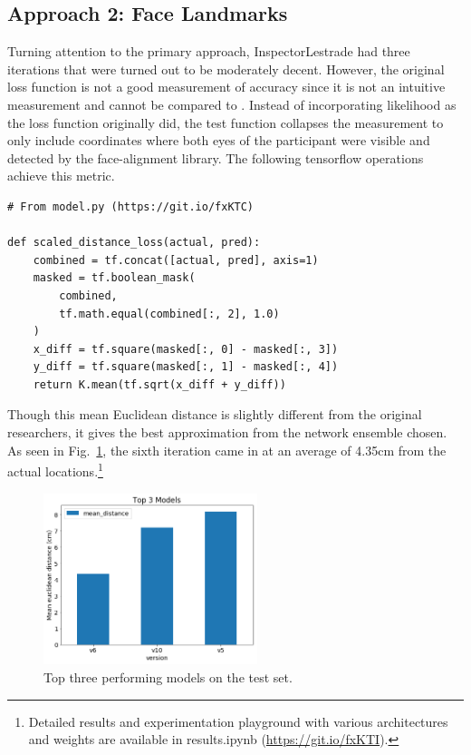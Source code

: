 \documentclass[aip, rsi, amsmath, amssymb, reprint, author-year, longbibliography]{revtex4-1}
\begin{document}
\subsection{\label{sec:level2} Approach 2: Face Landmarks}

Turning attention to the primary approach, InspectorLestrade had three
iterations that were turned out to be moderately decent. However, the original
loss function is not a good measurement of accuracy since it is not an intuitive
measurement and cannot be compared to \cite{7780608}. Instead of incorporating
likelihood as the loss function originally did, the test function collapses the
measurement to only include coordinates where both eyes of the participant were
visible and detected by the face-alignment library. The following tensorflow
operations achieve this metric.

\begin{lstlisting}
# From model.py (https://git.io/fxKTC)  

def scaled_distance_loss(actual, pred):
    combined = tf.concat([actual, pred], axis=1)
    masked = tf.boolean_mask(
        combined,
        tf.math.equal(combined[:, 2], 1.0)
    )
    x_diff = tf.square(masked[:, 0] - masked[:, 3])
    y_diff = tf.square(masked[:, 1] - masked[:, 4])
    return K.mean(tf.sqrt(x_diff + y_diff))
\end{lstlisting}

\vspace{0.5cm}
Though this mean Euclidean distance is slightly different from the original
researchers, it gives the best approximation from the network ensemble chosen.
As seen in Fig.~\ref{fig:top3models}, the sixth iteration came in at an average
of 4.35cm from the actual locations.\footnote{Detailed results and
  experimentation playground with various architectures and weights are
  available in results.ipynb (\url{https://git.io/fxKTI}).}

\begin{figure}[t]
\includegraphics[height=5cm]{lestrade-top-3-models.png}
\caption{\label{fig:top3models} Top three performing models on the test set.}
\end{figure}
\end{document}

